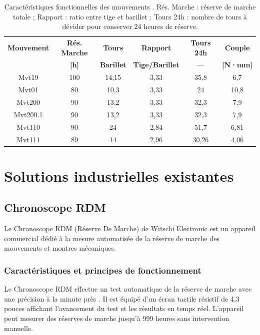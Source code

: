 \begin{table}[H]
    \centering
    \small
    \begin{tabular}{|c|c|c|c|c|c|}
        \hline
        \textbf{Mouvement} & \textbf{Rés. Marche} & \textbf{Tours} & \textbf{Rapport} & \textbf{Tours 24h} & \textbf{Couple} \\
        & \textbf{[h]} & \textbf{Barillet} & \textbf{Tige/Barillet} & — & \textbf{[N·mm]} \\
        \hline
        Mvt19 & 100 & 14,15 & 3,33 & 35,8 & 6,7 \\
        Mvt01 & 80 & 10,3 & 3,33 & 24 & 10,8 \\
        Mvt200 & 90 & 13,2 & 3,33 & 32,3 & 7,9 \\
        Mvt200.1 & 90 & 13,2 & 3,33 & 32,3 & 7,9 \\
        Mvt110 & 90 & 24 & 2,84 & 51,7 & 6,81 \\
        Mvt111 & 89 & 14 & 2,96 & 30,26 & 4,06 \\
        \hline
    \end{tabular}
    \caption{Caractéristiques fonctionnelles des mouvements \cite{breitling_donnees_internes}. Rés. Marche : réserve de marche totale ; Rapport : ratio entre tige et barillet ; Tours 24h : nombre de tours à dévider pour conserver 24 heures de réserve.}
    \label{tab:caracteristiques_mouvements}
\end{table}

\section{Solutions industrielles existantes}
\subsection{Chronoscope RDM}
\label{sec:sota-chronoscope-rdm}

Le Chronoscope RDM (Réserve De Marche) de Witschi Electronic est un appareil commercial dédié à la mesure automatisée de la réserve de marche des mouvements et montres mécaniques.

\subsubsection{Caractéristiques et principes de fonctionnement}

Le Chronoscope RDM effectue un test automatique de la réserve de marche avec une précision à la minute près \cite{Witschi_Chronoscope_RDM}. Il est équipé d'un écran tactile résistif de 4,3 pouces affichant l'avancement du test et les résultats en temps réel. L'appareil peut mesurer des réserves de marche jusqu'à 999 heures sans intervention manuelle.\\

